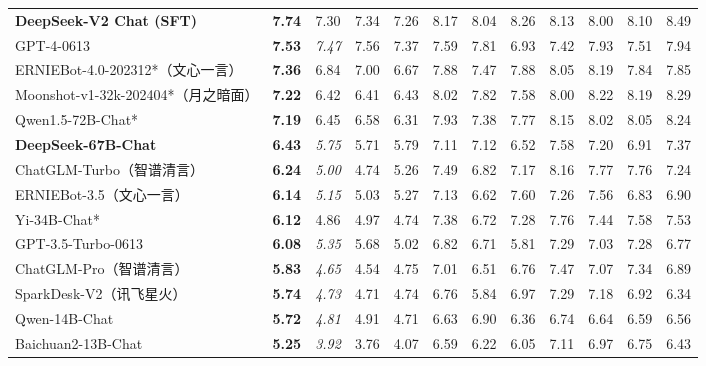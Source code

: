\documentclass[11pt, a4paper, logo, copyright, nonumbering]{deepseek}
\newcommand{\dsviisft}{DeepSeek-V2 Chat (SFT)}
\begin{document}
\begin{CJK*}{UTF8}{gbsn}
\begin{table}[!t]
{\begin{tabular}{@{}l|c|c|cc|c|cccccc@{}}
    \textbf{\dsviisft{}} & \textbf{7.74}&7.30&7.34&7.26&8.17& 8.04 &8.26&8.13&8.00 & 8.10&8.49 \\
    GPT-4-0613 & \textbf{7.53} & \multicolumn{1}{c|}{\textit{7.47}} & 7.56 & 7.37 & \multicolumn{1}{c|}{7.59} & 7.81 & 6.93 & 7.42 & 7.93 & 7.51 & 7.94 \\
    ERNIEBot-4.0-202312*（文心一言） & \textbf{7.36} & 6.84 & 7.00 & 6.67 & 7.88 & 7.47 & 7.88 & 8.05 & 8.19 & 7.84 & 7.85 \\
    Moonshot-v1-32k-202404*（月之暗面） & \textbf{7.22} & 6.42 & 6.41 & 6.43 & 8.02 & 7.82 & 7.58 & 8.00 & 8.22 & 8.19 & 8.29 \\
    Qwen1.5-72B-Chat* & \textbf{7.19} & 6.45 & 6.58 & 6.31 & 7.93 & 7.38 & 7.77 & 8.15 & 8.02 & 8.05 & 8.24\\
    \textbf{DeepSeek-67B-Chat} & \textbf{6.43} & \multicolumn{1}{c|}{\textit{5.75}} & 5.71 & 5.79 & \multicolumn{1}{c|}{7.11} & 7.12 & 6.52 & 7.58 & 7.20 & 6.91 & 7.37 \\
    ChatGLM-Turbo（智谱清言） & \textbf{6.24} & \multicolumn{1}{c|}{\textit{5.00}} & 4.74 & 5.26 & \multicolumn{1}{c|}{7.49} & 6.82 & 7.17 & 8.16 & 7.77 & 7.76 & 7.24 \\
    ERNIEBot-3.5（文心一言） & \textbf{6.14} & \multicolumn{1}{c|}{\textit{5.15}} & 5.03 & 5.27 & \multicolumn{1}{c|}{7.13} & 6.62 & 7.60 & 7.26 & 7.56 & 6.83 & 6.90 \\
    Yi-34B-Chat* & \textbf{6.12} & 4.86 & 4.97 & 4.74 & 7.38 & 6.72 & 7.28 & 7.76 & 7.44 & 7.58 & 7.53 \\
    GPT-3.5-Turbo-0613 & \textbf{6.08} & \multicolumn{1}{c|}{\textit{5.35}} & 5.68 & 5.02 & \multicolumn{1}{c|}{6.82} & 6.71 & 5.81 & 7.29 & 7.03 & 7.28 & 6.77 \\
    ChatGLM-Pro（智谱清言） & \textbf{5.83} & \multicolumn{1}{c|}{\textit{4.65}} & 4.54 & 4.75 & \multicolumn{1}{c|}{7.01} & 6.51 & 6.76 & 7.47 & 7.07 & 7.34 & 6.89 \\
    SparkDesk-V2（讯飞星火） & \textbf{5.74} & \multicolumn{1}{c|}{\textit{4.73}} & 4.71 & 4.74 & \multicolumn{1}{c|}{6.76} & 5.84 & 6.97 & 7.29 & 7.18 & 6.92 & 6.34 \\
    Qwen-14B-Chat & \textbf{5.72} & \multicolumn{1}{c|}{\textit{4.81}} & 4.91 & 4.71 & \multicolumn{1}{c|}{6.63} & 6.90 & 6.36 & 6.74 & 6.64 & 6.59 & 6.56 \\
    Baichuan2-13B-Chat & \textbf{5.25} & \multicolumn{1}{c|}{\textit{3.92}} & 3.76 & 4.07 & \multicolumn{1}{c|}{6.59} & 6.22 & 6.05 & 7.11 & 6.97 & 6.75 & 6.43 \\

\end{tabular}}
\end{table}
\end{CJK*}
\end{document}
